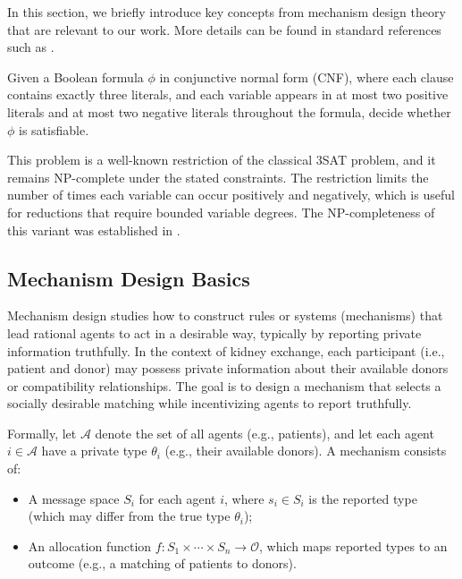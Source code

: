 In this section, we briefly introduce key concepts from mechanism design theory that are relevant to our work. More details can be found in standard references such as \cite{Roughgarden_2016}.


\begin{problem}
\label{prob:2p2n_3sat}
Given a Boolean formula $\phi$ in conjunctive normal form (CNF), where each clause contains exactly three literals, and each variable appears in at most two positive literals and at most two negative literals throughout the formula, decide whether $\phi$ is satisfiable.
\end{problem}

This problem is a well-known restriction of the classical \textsc{3SAT} problem, and it remains NP-complete under the stated constraints. The restriction limits the number of times each variable can occur positively and negatively, which is useful for reductions that require bounded variable degrees. The NP-completeness of this variant was established in \cite{berman2003restricted}.


\subsection*{Mechanism Design Basics}

Mechanism design studies how to construct rules or systems (mechanisms) that lead rational agents to act in a desirable way, typically by reporting private information truthfully. In the context of kidney exchange, each participant (i.e., patient and donor) may possess private information about their available donors or compatibility relationships. The goal is to design a mechanism that selects a socially desirable matching while incentivizing agents to report truthfully.

Formally, let $\mathcal{A}$ denote the set of all agents (e.g., patients), and let each agent $i \in \mathcal{A}$ have a private type $\theta_i$ (e.g., their available donors). A mechanism consists of:
\begin{itemize}
    \item A message space $S_i$ for each agent $i$, where $s_i \in S_i$ is the reported type (which may differ from the true type $\theta_i$);
    \item An allocation function $f : S_1 \times \cdots \times S_n \rightarrow \mathcal{O}$, which maps reported types to an outcome (e.g., a matching of patients to donors).
\end{itemize}


